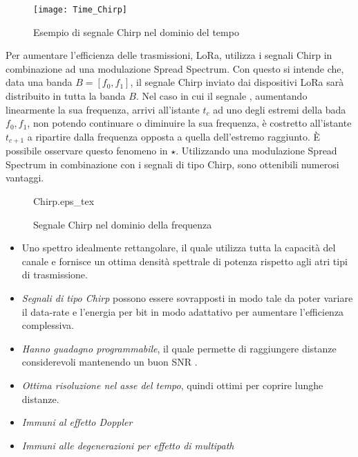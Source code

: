 \begin{figure}[h]
        \centering
                \texttt{[image: Time\_Chirp]}
        \caption{Esempio di segnale Chirp nel dominio del tempo}
\end{figure}
Per aumentare l'efficienza delle trasmissioni, LoRa, utilizza i segnali Chirp in combinazione ad una
modulazione Spread Spectrum. Con questo si intende che, data una banda $B =
[f_0,f_1]$, il segnale Chirp inviato dai dispositivi LoRa sarà distribuito in tutta la banda
$B$. Nel caso in cui il segnale ,  aumentando linearmente la sua frequenza,
arrivi all'istante $t_c$ ad uno degli estremi della bada $f_0,f_1$, non potendo
continuare o diminuire la sua frequenza,
 è costretto all'istante $t_{c+1}$ a ripartire dalla frequenza opposta a quella
dell'estremo raggiunto. È possibile osservare questo fenomeno in
\hyperlink{label_in_fig_1}{$\star$}.
Utilizzando una modulazione Spread Spectrum in combinazione con i segnali di tipo
Chirp, sono ottenibili numerosi vantaggi.
\begin{figure}[h]
        \centering
                {Chirp.eps_tex}
        \caption{Segnale Chirp nel dominio della frequenza}
\end{figure}
\begin{itemize}
\item Uno spettro idealmente rettangolare, il quale utilizza tutta la capacità
del canale e fornisce un ottima densità spettrale di potenza rispetto agli atri
tipi di trasmissione.
\item \textit{Segnali di tipo Chirp} possono essere sovrapposti in modo tale da
poter variare il data-rate e l'energia per bit in modo adattativo per aumentare
l'efficienza complessiva.
\item \textit{Hanno guadagno programmabile}, il quale permette di raggiungere
distanze considerevoli mantenendo un buon SNR .
\item  \textit{Ottima risoluzione nel asse del tempo}, quindi ottimi per coprire
lunghe distanze.
\item \textit{Immuni al effetto Doppler} 
\item \textit{Immuni alle degenerazioni per effetto di multipath} 
\end{itemize}
